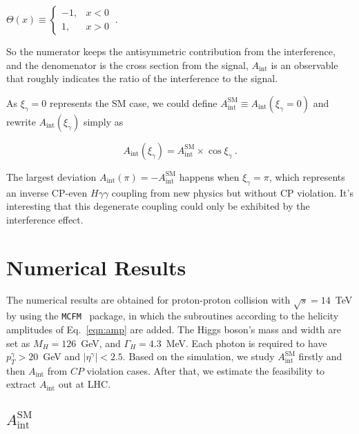 \documentclass[twocolumn,
prd,amssymb,amsmath,preprintnumbers,
floatfix,aps,nofootinbib]{revtex4-1}
\newcommand{\beq}{\begin{equation}}
\newcommand{\eeq}{\end{equation}}
\begin{document}
\begin{center}
\begin{math}
\Theta(x)\equiv
\left\{
\begin{array}{rc}
-1, & x<0 \\
1, & x>0
\end{array}
\right.~.
\end{math}
\end{center}
So the numerator keeps the antisymmetric contribution from the interference, and the
denomenator is the cross section
from the signal, $A_{\text{int}}$ is an observable
that roughly indicates the ratio of the interference to the signal.

As $\xi_\gamma=0$ represents the SM case, we could define
 $A_{\text{int}}^{\text{SM}}\equiv A_{\text{int}}(\xi_\gamma=0)$ and
 rewrite $A_{\text{int}}(\xi_\gamma)$ simply as

\beq
 A_{\text{int}}(\xi_\gamma) = A_{\text{int}}^{\text{SM}}\times \cos\xi_\gamma ~.
\label{eqn:aint_bsm}
\eeq

The largest deviation $A_{\text{int}}(\pi) = -A_{\text{int}}^{\text{SM}}$ happens when $\xi_\gamma = \pi$, which represents an inverse CP-even $H\gamma\gamma$ coupling
from new physics but without CP violation.
It's interesting that this degenerate coupling could only be exhibited by the interference effect.


\section{Numerical Results\label{section:simulation}}

The numerical results are obtained for proton-proton collision with $\sqrt{s}=14$~TeV by using the \texttt{MCFM}~\cite{Campbell:2011bn} package, in which the subroutines according to the helicity amplitudes of Eq.~\eqref{eqn:amp} are added.
The Higgs boson's mass and width are set as $M_H=126$~GeV, and $\Gamma_H=4.3$~MeV.
Each photon is required to have $p^{\gamma}_T>20$~GeV and $|\eta^{\gamma}|<2.5$.
Based on the simulation, we study $A^{\text{SM}}_{\text{int}}$ firstly and then
$A_{\text{int}}$ from $CP$ violation cases.
After that, we estimate the feasibility to extract $A_{\text{int}}$ out at LHC.

\subsection {$A_{\text{int}}^{\text{SM}}$}
\end{document}

